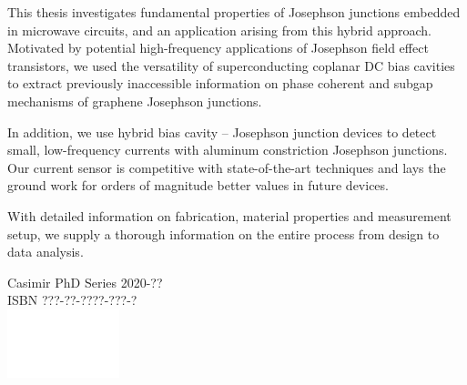 \documentclass{dissertation-edit}
\begin{document}
\vspace*{1cm}

\Large

\noindent This thesis investigates fundamental properties of Josephson junctions embedded in microwave circuits, and an application arising from this hybrid approach.
%
Motivated by potential high-frequency applications of Josephson field effect transistors, we used the versatility of superconducting coplanar DC bias cavities to extract previously inaccessible information on phase coherent and subgap mechanisms of graphene Josephson junctions.

\noindent \newline
In addition, we use hybrid bias cavity -- Josephson junction devices to detect small, low-frequency currents with aluminum constriction Josephson junctions.
%
Our current sensor is competitive with state-of-the-art techniques and lays the ground work for orders of magnitude better values in future devices.

\noindent \newline
With detailed information on fabrication, material properties and measurement setup, we supply a thorough  information on the entire process from design to data analysis.

\vspace{3cm}\noindent\newline\centering
Casimir PhD Series 2020-??\\
ISBN ???-??-????-???-?\\
\includegraphics[height=2cm]{TU_P5_white}
\end{document}
